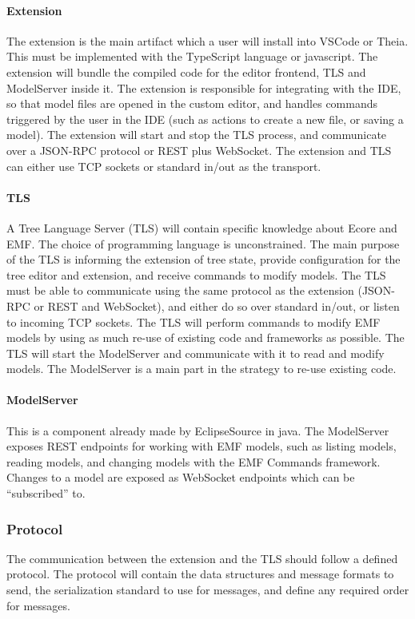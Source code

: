 \paragraph{Extension}
The extension is the main artifact which a user will install into \gls{VSCode} or \gls{Theia}.
This must be implemented with the \gls{TypeScript} language or javascript.
The extension will bundle the compiled code for the editor frontend, TLS and ModelServer inside it.
The extension is responsible for integrating with the \gls{IDE}, so that model files are opened in the custom editor, and handles commands triggered by the user in the \gls{IDE} (such as actions to create a new file, or saving a model).
The extension will start and stop the TLS process, and communicate over a \gls{JSON-RPC} protocol or \gls{REST} plus \gls{WebSocket}.
The extension and TLS can either use TCP sockets or standard in/out as the transport.

\paragraph{TLS}
A Tree Language Server (TLS) will contain specific knowledge about \gls{Ecore} and \acrshort{EMF}.
The choice of programming language is unconstrained.
The main purpose of the TLS is informing the extension of tree state, provide configuration for the tree editor and extension, and receive commands to modify models.
The TLS must be able to communicate using the same protocol as the extension (\gls{JSON-RPC} or \gls{REST} and \gls{WebSocket}), and either do so over standard in/out, or listen to incoming TCP sockets.
The TLS will perform commands to modify \acrshort{EMF} models by using as much re-use of existing code and frameworks as possible.
The TLS will start the ModelServer and communicate with it to read and modify models.
The ModelServer is a main part in the strategy to re-use existing code.

\paragraph{ModelServer}
This is a component already made by EclipseSource in java.
The ModelServer exposes \gls{REST} endpoints for working with \acrshort{EMF} models, such as listing models, reading models, and changing models with the EMF Commands framework.
Changes to a model are exposed as \gls{WebSocket} endpoints which can be ``subscribed'' to.


\subsubsection{Protocol}
The communication between the extension and the TLS should follow a defined protocol.
The protocol will contain the data structures and message formats to send, the serialization standard to use for messages, and define any required order for messages.


